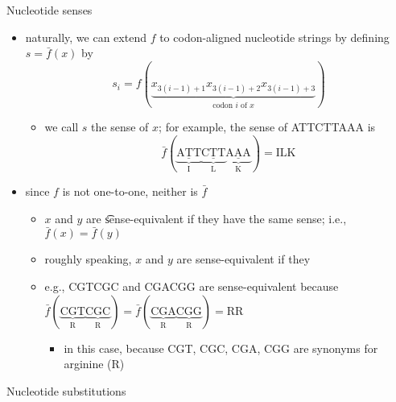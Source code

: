   \item Nucleotide senses
  \begin{itemize}
\item naturally, we can extend $f$ to codon-aligned nucleotide
  strings by defining $s = \bar{f}(x)$ by
  \[
        s_i = f(
          \underbrace{
            x_{3(i-1)+1 } x_{3(i-1)+2} x_{3(i-1)+3}
          }_{\text{codon } i \text{ of } x}
        )
      \]
  \begin{itemize}
  \item we call $s$ the sense of $x$; for example, the sense
      of ATTCTTAAA is
      \[
            \bar{f}(
                \underbrace{\underline{\text{ATT}}}_{\text{I}}
                \underbrace{\underline{\text{CTT}}}_{\text{L}}
                \underbrace{\underline{\text{AAA}}}_{\text{K}}
            ) = \text{ILK}
          \]
  \end{itemize}
\item since $f$ is not one-to-one, neither is $\bar{f}$
  \begin{itemize}
  \item $x$ and $y$ are \t{sense-equivalent} if they have the
      same sense; i.e., $\bar{f}(x) = \bar{f}(y)$
  \item roughly speaking, $x$ and $y$ are sense-equivalent if
      they 
  \item e.g., CGTCGC and CGACGG are sense-equivalent because
      $
            \bar{f}(
                \underbrace{\text{CGT}}_{\text{R}}
                \underbrace{\text{CGC}}_{\text{R}}
            ) = \bar{f}(
                \underbrace{\text{CGA}}_{\text{R}}
                \underbrace{\text{CGG}}_{\text{R}}
            ) = \text{RR}$
      \begin{itemize}
    \item in this case, because CGT, CGC, CGA, CGG are synonyms
              for arginine (R)
      \end{itemize}
  \end{itemize}
  \end{itemize}
  \item Nucleotide substitutions
